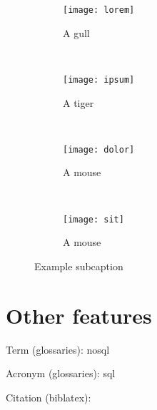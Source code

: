\begin{figure}[H]
	\centering
	\begin{subfigure}[b]{0.45\textwidth}
		\texttt{[image: lorem]}
		\caption{A gull}
		\label{fig:lorem}
	\end{subfigure}
	~ %
	\begin{subfigure}[b]{0.45\textwidth}
		\texttt{[image: ipsum]}
		\caption{A tiger}
		\label{fig:ipsum}
	\end{subfigure}
	~ %
	\begin{subfigure}[b]{0.45\textwidth}
		\texttt{[image: dolor]}
		\caption{A mouse}
		\label{fig:dolor}
	\end{subfigure}
	~ %
	\begin{subfigure}[b]{0.45\textwidth}
		\texttt{[image: sit]}
		\caption{A mouse}
		\label{fig:sit}
	\end{subfigure}
	\caption{Example subcaption}\label{fig:animals}
\end{figure}

\section{Other features}

Term (glossaries): \gls{nosql}

Acronym (glossaries): \gls{sql}

Citation (biblatex): \cite{chandola2009anomaly}


